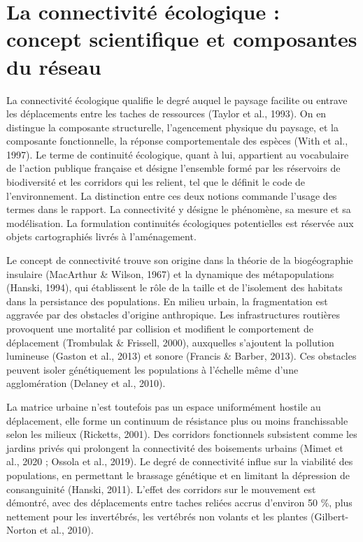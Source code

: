 \documentclass[a4paper,12pt]{report}
\begin{document}
\section{La connectivité écologique : concept scientifique et composantes du réseau}
La connectivité écologique qualifie le degré auquel le paysage facilite ou entrave les déplacements entre les taches de ressources (Taylor et al., 1993). On en distingue la composante structurelle, l'agencement physique du paysage, et la composante fonctionnelle, la réponse comportementale des espèces (With et al., 1997). Le terme de continuité écologique, quant à lui, appartient au vocabulaire de l'action publique française et désigne l'ensemble formé par les réservoirs de biodiversité et les corridors qui les relient, tel que le définit le code de l'environnement. La distinction entre ces deux notions commande l'usage des termes dans le rapport. La connectivité y désigne le phénomène, sa mesure et sa modélisation. La formulation continuités écologiques potentielles est réservée aux objets cartographiés livrés à l'aménagement.

Le concept de connectivité trouve son origine dans la théorie de la biogéographie insulaire (MacArthur \& Wilson, 1967) et la dynamique des métapopulations (Hanski, 1994), qui établissent le rôle de la taille et de l'isolement des habitats dans la persistance des populations. En milieu urbain, la fragmentation est aggravée par des obstacles d'origine anthropique. Les infrastructures routières provoquent une mortalité par collision et modifient le comportement de déplacement (Trombulak \& Frissell, 2000), auxquelles s'ajoutent la pollution lumineuse (Gaston et al., 2013) et sonore (Francis \& Barber, 2013). Ces obstacles peuvent isoler génétiquement les populations à l'échelle même d'une agglomération (Delaney et al., 2010).

La matrice urbaine n'est toutefois pas un espace uniformément hostile au déplacement, elle forme un continuum de résistance plus ou moins franchissable selon les milieux (Ricketts, 2001). Des corridors fonctionnels subsistent comme les jardins privés qui prolongent la connectivité des boisements urbains (Mimet et al., 2020 ; Ossola et al., 2019). Le degré de connectivité influe sur la viabilité des populations, en permettant le brassage génétique et en limitant la dépression de consanguinité (Hanski, 2011). L'effet des corridors sur le mouvement est démontré, avec des déplacements entre taches reliées accrus d'environ 50 \%, plus nettement pour les invertébrés, les vertébrés non volants et les plantes (Gilbert-Norton et al., 2010).
\end{document}
